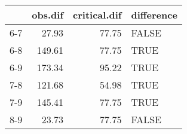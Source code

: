 \begin{table}[ht]
\centering
\begin{tabular}{rrrl}
  \hline
 & obs.dif & critical.dif & difference \\ 
  \hline
6-7 & 27.93 & 77.75 & FALSE \\ 
  6-8 & 149.61 & 77.75 & TRUE \\ 
  6-9 & 173.34 & 95.22 & TRUE \\ 
  7-8 & 121.68 & 54.98 & TRUE \\ 
  7-9 & 145.41 & 77.75 & TRUE \\ 
  8-9 & 23.73 & 77.75 & FALSE \\ 
   \hline
\end{tabular}
\end{table}
